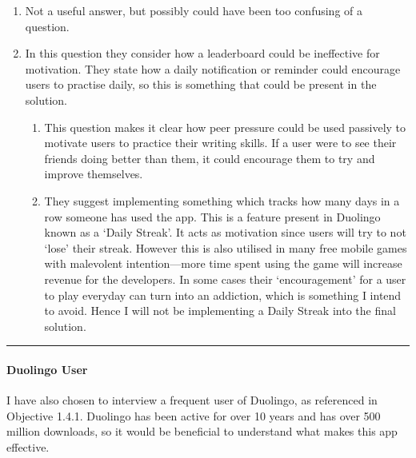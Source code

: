 \documentclass{article}
\begin{document}
\begin{enumerate}
    \begin{enumerate}
        \item They express concerns over demotivation from seeing the statistics of others who are more fluent. I will take this opinion into consideration, along with the insight of a frequent user of Duolingo.
    \end{enumerate}
    \item Not a useful answer, but possibly could have been too confusing of a question.
    \item In this question they consider how a leaderboard could be ineffective for motivation. They state how a daily notification or reminder could encourage users to practise daily, so this is something that could be present in the solution.
    \begin{enumerate}
        \item This question makes it clear how peer pressure could be used passively to motivate users to practice their writing skills. If a user were to see their friends doing better than them, it could encourage them to try and improve themselves.
        \item They suggest implementing something which tracks how many days in a row someone has used the app. This is a feature present in Duolingo known as a `Daily Streak'. It acts as motivation since users will try to not `lose' their streak. However this is also utilised in many free mobile games with malevolent intention---more time spent using the game will increase revenue for the developers. In some cases their `encouragement' for a user to play everyday can turn into an addiction, which is something I intend to avoid. Hence I will not be implementing a Daily Streak into the final solution.
    \end{enumerate}
\end{enumerate}

\begin{center}
\rule{0.5\linewidth}{0.4pt}
\end{center}

\paragraph{Duolingo User\\}
I have also chosen to interview a frequent user of Duolingo, as referenced in Objective 1.4.1. Duolingo has been active for over 10 years and has over 500 million downloads, so it would be beneficial to understand what makes this app effective.
\end{document}
